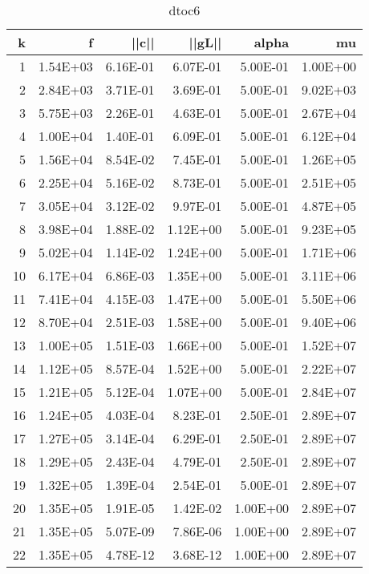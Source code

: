 \documentclass[12pt]{article}
\begin{document}
\begin{table}[htbp]
  \centering
  \caption{dtoc6}
    \begin{tabular}{rrrrrr}
    \toprule
    k     & f     & ||c|| & ||gL||   & alpha & mu \\
    \midrule
    1     & 1.54E+03 & 6.16E-01 & 6.07E-01 & 5.00E-01 & 1.00E+00 \\
    2     & 2.84E+03 & 3.71E-01 & 3.69E-01 & 5.00E-01 & 9.02E+03 \\
    3     & 5.75E+03 & 2.26E-01 & 4.63E-01 & 5.00E-01 & 2.67E+04 \\
    4     & 1.00E+04 & 1.40E-01 & 6.09E-01 & 5.00E-01 & 6.12E+04 \\
    5     & 1.56E+04 & 8.54E-02 & 7.45E-01 & 5.00E-01 & 1.26E+05 \\
    6     & 2.25E+04 & 5.16E-02 & 8.73E-01 & 5.00E-01 & 2.51E+05 \\
    7     & 3.05E+04 & 3.12E-02 & 9.97E-01 & 5.00E-01 & 4.87E+05 \\
    8     & 3.98E+04 & 1.88E-02 & 1.12E+00 & 5.00E-01 & 9.23E+05 \\
    9     & 5.02E+04 & 1.14E-02 & 1.24E+00 & 5.00E-01 & 1.71E+06 \\
    10    & 6.17E+04 & 6.86E-03 & 1.35E+00 & 5.00E-01 & 3.11E+06 \\
    11    & 7.41E+04 & 4.15E-03 & 1.47E+00 & 5.00E-01 & 5.50E+06 \\
    12    & 8.70E+04 & 2.51E-03 & 1.58E+00 & 5.00E-01 & 9.40E+06 \\
    13    & 1.00E+05 & 1.51E-03 & 1.66E+00 & 5.00E-01 & 1.52E+07 \\
    14    & 1.12E+05 & 8.57E-04 & 1.52E+00 & 5.00E-01 & 2.22E+07 \\
    15    & 1.21E+05 & 5.12E-04 & 1.07E+00 & 5.00E-01 & 2.84E+07 \\
    16    & 1.24E+05 & 4.03E-04 & 8.23E-01 & 2.50E-01 & 2.89E+07 \\
    17    & 1.27E+05 & 3.14E-04 & 6.29E-01 & 2.50E-01 & 2.89E+07 \\
    18    & 1.29E+05 & 2.43E-04 & 4.79E-01 & 2.50E-01 & 2.89E+07 \\
    19    & 1.32E+05 & 1.39E-04 & 2.54E-01 & 5.00E-01 & 2.89E+07 \\
    20    & 1.35E+05 & 1.91E-05 & 1.42E-02 & 1.00E+00 & 2.89E+07 \\
    21    & 1.35E+05 & 5.07E-09 & 7.86E-06 & 1.00E+00 & 2.89E+07 \\
   22    & 1.35E+05 & 4.78E-12 & 3.68E-12 & 1.00E+00 & 2.89E+07 \\
    \bottomrule
    \end{tabular}%
  \label{tab:addlabel}%
\end{table}%
 
\end{document}
